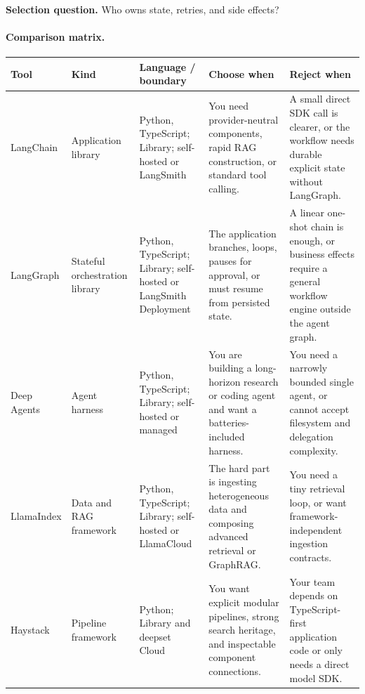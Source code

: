 \textbf{Selection question.} Who owns state, retries, and side effects?
\begin{center}\end{center}
\paragraph{Comparison matrix.}
\begin{longtable}{@{}p{20mm}p{22mm}p{26mm}p{46mm}p{46mm}@{}}
\toprule\textbf{Tool} & \textbf{Kind} & \textbf{Language / boundary} & \textbf{Choose when} & \textbf{Reject when}\\\midrule\endhead
LangChain & Application library & Python, TypeScript; Library; self-hosted or LangSmith & You need provider-neutral components, rapid RAG construction, or standard tool calling. & A small direct SDK call is clearer, or the workflow needs durable explicit state without LangGraph.\\
LangGraph & Stateful orchestration library & Python, TypeScript; Library; self-hosted or LangSmith Deployment & The application branches, loops, pauses for approval, or must resume from persisted state. & A linear one-shot chain is enough, or business effects require a general workflow engine outside the agent graph.\\
Deep Agents & Agent harness & Python, TypeScript; Library; self-hosted or managed & You are building a long-horizon research or coding agent and want a batteries-included harness. & You need a narrowly bounded single agent, or cannot accept filesystem and delegation complexity.\\
LlamaIndex & Data and RAG framework & Python, TypeScript; Library; self-hosted or LlamaCloud & The hard part is ingesting heterogeneous data and composing advanced retrieval or GraphRAG. & You need a tiny retrieval loop, or want framework-independent ingestion contracts.\\
Haystack & Pipeline framework & Python; Library and deepset Cloud & You want explicit modular pipelines, strong search heritage, and inspectable component connections. & Your team depends on TypeScript-first application code or only needs a direct model SDK.\\

\end{longtable}
